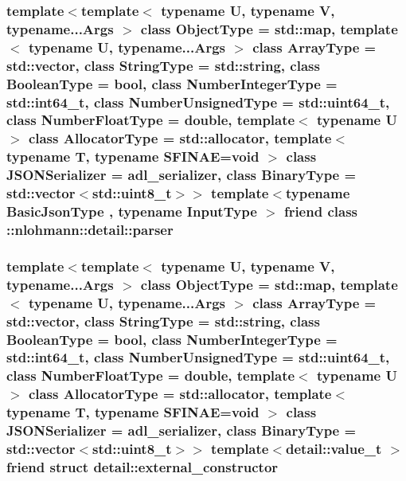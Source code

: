 \subsubsection[{\texorpdfstring{\+::nlohmann\+::detail\+::parser}{::nlohmann::detail::parser}}]{\setlength{\rightskip}{0pt plus 5cm}template$<$template$<$ typename U, typename V, typename...\+Args $>$ class Object\+Type = std\+::map, template$<$ typename U, typename...\+Args $>$ class Array\+Type = std\+::vector, class String\+Type  = std\+::string, class Boolean\+Type  = bool, class Number\+Integer\+Type  = std\+::int64\+\_\+t, class Number\+Unsigned\+Type  = std\+::uint64\+\_\+t, class Number\+Float\+Type  = double, template$<$ typename U $>$ class Allocator\+Type = std\+::allocator, template$<$ typename T, typename S\+F\+I\+N\+A\+E=void $>$ class J\+S\+O\+N\+Serializer = adl\+\_\+serializer, class Binary\+Type  = std\+::vector$<$std\+::uint8\+\_\+t$>$$>$ template$<$typename Basic\+Json\+Type , typename Input\+Type $>$ friend class \+::{\bf nlohmann\+::detail\+::parser}\hspace{0.3cm}{\ttfamily [friend]}}\hypertarget{classnlohmann_1_1basic__json_ac8f3125911eb018ef4ab00d879487baf}{}\label{classnlohmann_1_1basic__json_ac8f3125911eb018ef4ab00d879487baf}
\subsubsection[{\texorpdfstring{detail\+::external\+\_\+constructor}{detail::external_constructor}}]{\setlength{\rightskip}{0pt plus 5cm}template$<$template$<$ typename U, typename V, typename...\+Args $>$ class Object\+Type = std\+::map, template$<$ typename U, typename...\+Args $>$ class Array\+Type = std\+::vector, class String\+Type  = std\+::string, class Boolean\+Type  = bool, class Number\+Integer\+Type  = std\+::int64\+\_\+t, class Number\+Unsigned\+Type  = std\+::uint64\+\_\+t, class Number\+Float\+Type  = double, template$<$ typename U $>$ class Allocator\+Type = std\+::allocator, template$<$ typename T, typename S\+F\+I\+N\+A\+E=void $>$ class J\+S\+O\+N\+Serializer = adl\+\_\+serializer, class Binary\+Type  = std\+::vector$<$std\+::uint8\+\_\+t$>$$>$ template$<$detail\+::value\+\_\+t $>$ friend struct {\bf detail\+::external\+\_\+constructor}\hspace{0.3cm}{\ttfamily [friend]}}\hypertarget{classnlohmann_1_1basic__json_a6275ed57bae6866cdf5db5370a7ad47c}{}\label{classnlohmann_1_1basic__json_a6275ed57bae6866cdf5db5370a7ad47c}
